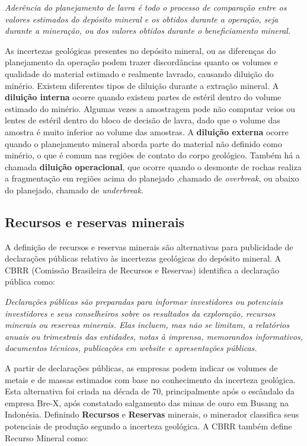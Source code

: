 \begin{definition}
	\textit{Aderência do planejamento de lavra é todo o processo de comparação entre os valores estimados do depósito mineral e os obtidos durante a operação, seja durante a mineração, ou dos valores obtidos durante o beneficiamento mineral.} 
\end{definition}

As incertezas geológicas presentes no depósito mineral, ou as diferenças do planejamento da operação podem trazer discordâncias quanto os volumes e qualidade do material estimado e realmente lavrado, causando diluição do minério. Existem diferentes tipos de diluição durante a extração mineral. A \textbf{diluição interna} ocorre quando existem partes de estéril dentro do volume estimado do minério. Algumas vezes a amostragem pode não computar veios ou lentes de estéril dentro do bloco de decisão de lavra, dado que o volume das amostra é muito inferior ao volume das amostras. A \textbf{diluição externa} ocorre quando o planejamento mineral aborda parte do material não definido como minério, o que é comum nas regiões de contato do corpo geológico. Também há a chamada \textbf{diluição operacional}, que ocorre quando o desmonte de rochas realiza a fragmentação em regiões acima do planejado ,chamado de \textit{overbreak}, ou abaixo do planejado, chamado de \textit{underbreak}.

\subsection{Recursos e reservas minerais}

A definição de recursos e reservas minerais são alternativas para publicidade de declarações públicas relativo às incertezas geológicas do depósito mineral. A CBRR (Comissão Brasileira de Recursos e Reservas) identifica a declaração pública como:

\begin{definition}
	\textit{Declarações públicas são preparadas para informar investidores ou potenciais investidores e seus conselheiros sobre os resultados da exploração, recursos minerais ou reservas minerais. Elas incluem, mas não se limitam, a relatórios anuais ou trimestrais das entidades, notas  à imprensa, memorandos informativos, documentos técnicos, publicações em website e apresentações públicas.} 
\end{definition}

A partir de declarações públicas, as empresas podem indicar os volumes de metais e de massas estimados com base no conhecimento da incerteza geológica. Esta alternativa foi criada na década de 70, principalmente após o escândalo da empresa Bre-X, após constatado salgamento das minas de ouro em Busang na Indonésia. Definindo \textbf{Recursos} e \textbf{Reservas} minerais, o minerador classifica seus potenciais de produção segundo a incerteza geológica. A CBRR também define Recurso Mineral como:

